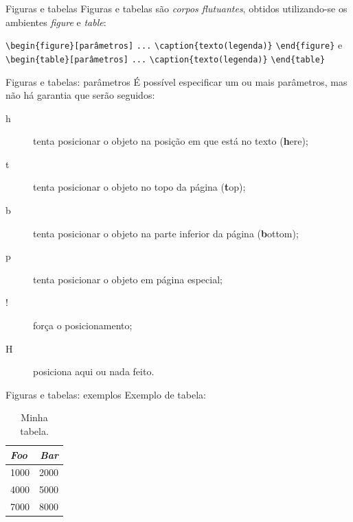 \begin{frame}[fragile]{Figuras e tabelas}
Figuras e tabelas s\~ao \emph{corpos flutuantes}, obtidos utilizando-se os ambientes \emph{figure} e \emph{table}:\newline

\verb|\begin{figure}[parâmetros]| \newline
\verb|...|\newline
\verb|\caption{texto(legenda)}| \newline
\verb|\end{figure}| \newline
e \newline
\verb|\begin{table}[parâmetros]| \newline
\verb|...|\newline
\verb|\caption{texto(legenda)}| \newline
\verb|\end{table}| \newline

\end{frame}



\begin{frame}[fragile]{Figuras e tabelas: par\^ametros}
\'E poss\'ivel especificar um ou mais par\^ametros, mas n\~ao h\'a garantia que ser\~ao seguidos:\newline
\begin{description}
\item[h] tenta posicionar o objeto na posi{\c c}\~ao em que est\'a no texto (\textbf{h}ere);
\item[t] tenta posicionar o objeto no topo da p\'agina (\textbf{t}op);
\item[b] tenta posicionar o objeto na parte inferior da p\'agina (\textbf{b}ottom);
\item[p] tenta posicionar o objeto em p\'agina especial;
\item[!] for{\c c}a o posicionamento;
\item[H] posiciona aqui ou nada feito.
\end{description}
\end{frame}

\begin{frame}[fragile]{Figuras e tabelas: exemplos}
Exemplo de tabela: \newline

\begin{table}[!ht]
\centering
\caption{Minha tabela.}
\begin{tabular}{|l|r|}     \hline
\emph{Foo}  &  \emph{Bar} \\ \hline
1000        &  2000       \\ \hline
4000        &  5000       \\ \hline
7000        &  8000       \\ \hline
\end{tabular}
\end{table}
\end{frame}


